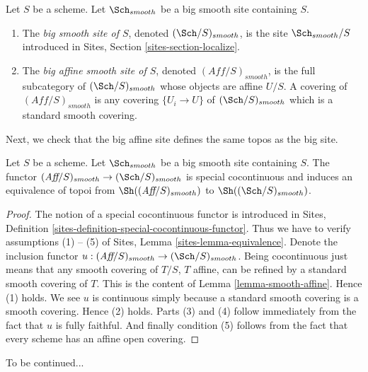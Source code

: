 \begin{definition}
\label{definition-big-small-smooth}
Let $S$ be a scheme. Let $\Sch_{smooth}$ be a big smooth
site containing $S$.
\begin{enumerate}
\item The {\it big smooth site of $S$}, denoted
$(\Sch/S)_{smooth}$, is the site $\Sch_{smooth}/S$
introduced in Sites, Section \ref{sites-section-localize}.
\item The {\it big affine smooth site of $S$}, denoted
$(\textit{Aff}/S)_{smooth}$, is the full subcategory of
$(\Sch/S)_{smooth}$ whose objects are affine $U/S$.
A covering of $(\textit{Aff}/S)_{smooth}$ is any covering
$\{U_i \to U\}$ of $(\Sch/S)_{smooth}$ which is a
standard smooth covering.
\end{enumerate}
\end{definition}

\noindent
Next, we check that the big affine site defines the same
topos as the big site.

\begin{lemma}
\label{lemma-affine-big-site-smooth}
Let $S$ be a scheme. Let $\Sch_{smooth}$ be a big smooth
site containing $S$.
The functor
$(\textit{Aff}/S)_{smooth} \to (\Sch/S)_{smooth}$
is special cocontinuous and induces an equivalence of topoi from
$\Sh((\textit{Aff}/S)_{smooth})$ to
$\Sh((\Sch/S)_{smooth})$.
\end{lemma}

\begin{proof}
The notion of a special cocontinuous functor is introduced in
Sites, Definition \ref{sites-definition-special-cocontinuous-functor}.
Thus we have to verify assumptions (1) -- (5) of
Sites, Lemma \ref{sites-lemma-equivalence}.
Denote the inclusion functor
$u : (\textit{Aff}/S)_{smooth} \to (\Sch/S)_{smooth}$.
Being cocontinuous just means that any smooth covering of
$T/S$, $T$ affine, can be refined by a standard smooth covering of $T$.
This is the content of
Lemma \ref{lemma-smooth-affine}.
Hence (1) holds. We see $u$ is continuous simply because a standard
smooth covering is a smooth covering. Hence (2) holds.
Parts (3) and (4) follow immediately from the fact that $u$ is
fully faithful. And finally condition (5) follows from the
fact that every scheme has an affine open covering.
\end{proof}

\noindent
To be continued...

